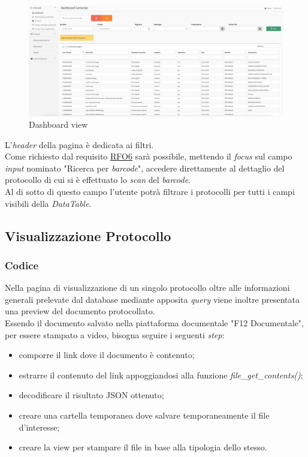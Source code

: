         \begin{figure}[!h] 
            \centering 
            \includegraphics[width=\textwidth]{immagini/prodottofinito/dashboard.png}
            \caption{Dashboard view}
        \end{figure}
        \newpage
        L'\textit{header} della pagina è dedicata ai filtri. 
        \\
        Come richiesto dal requisito \hyperref[RFO6]{RFO6} sarà possibile, mettendo il \textit{focus} sul campo \textit{input} nominato "Ricerca per \textit{barcode}", accedere direttamente al dettaglio del protocollo di cui si è effettuato lo \textit{scan} del \textit{barcode}.
        \\
        Al di sotto di questo campo l'utente potrà filtrare i protocolli per tutti i campi visibili della \textit{DataTable}.

\subsection{Visualizzazione Protocollo}

    \subsubsection{Codice}
        Nella pagina di visualizzazione di un singolo protocollo oltre alle informazioni generali prelevate dal database mediante apposita \textit{query} viene inoltre presentata una preview del documento protocollato.
        \\
        Essendo il documento salvato nella piattaforma documentale "F12 Documentale", per essere stampato a video, bisogna seguire i seguenti \textit{step}:
        \begin{itemize}
            \item comporre il link dove il documento è contenuto;
            
            \item estrarre il contenuto del link appoggiandosi alla funzione \textit{file\_get\_contents()};
            
            \item decodificare il risultato JSON ottenuto;
        
            \item creare una cartella temporanea dove salvare temporaneamente il file d'interesse;
            
            \item creare la view per stampare il file in base alla tipologia dello stesso.
        \end{itemize}
        
